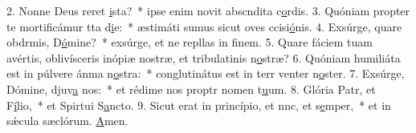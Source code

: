 2. Nonne Deus reret \uline{i}sta?~* ipse enim novit abscndita c\uline{o}rdis.
3. Quóniam propter te mortificámur tta d\uline{i}e:~* æstimáti sumus sicut oves ccisi\uline{ó}nis.
4. Exsúrge, quare obdrmis, D\uline{ó}mine?~* exsúrge, et ne repllas in f\uline{i}nem.
5. Quare fáciem tuam avértis, oblivísceris inópiæ nostræ, et tribulatinis n\uline{o}stræ?
6. Quóniam humiliáta est in púlvere ánma n\uline{o}stra:~* conglutinátus est in terr venter n\uline{o}ster.
7. Exsúrge, Dómine, djuv\uline{a} nos:~* et rédime nos proptr nomen t\uline{u}um.
8. Glória Patr, et F\uline{í}lio,~* et Spirtui S\uline{a}ncto.
9. Sicut erat in princípio, et nnc, et s\uline{e}mper,~* et in sǽcula sæclórum. \uline{A}men.
